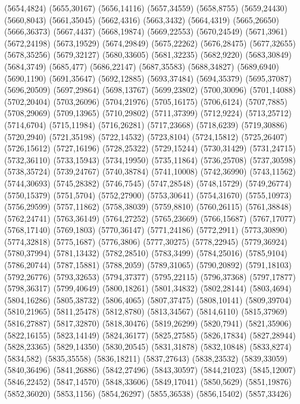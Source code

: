 (5654,4824)
(5655,30167)
(5656,14116)
(5657,34559)
(5658,8755)
(5659,24430)
(5660,8043)
(5661,35045)
(5662,4316)
(5663,3432)
(5664,4319)
(5665,26650)
(5666,36373)
(5667,4437)
(5668,19874)
(5669,22553)
(5670,24549)
(5671,3961)
(5672,24198)
(5673,19529)
(5674,29849)
(5675,22262)
(5676,28475)
(5677,32655)
(5678,35256)
(5679,32127)
(5680,33605)
(5681,32235)
(5682,9220)
(5683,30849)
(5684,3749)
(5685,477)
(5686,22147)
(5687,35583)
(5688,34827)
(5689,6940)
(5690,1190)
(5691,35647)
(5692,12885)
(5693,37484)
(5694,35379)
(5695,37087)
(5696,20509)
(5697,29864)
(5698,13767)
(5699,23802)
(5700,30096)
(5701,14088)
(5702,20404)
(5703,26096)
(5704,21976)
(5705,16175)
(5706,6124)
(5707,7885)
(5708,29069)
(5709,13965)
(5710,29802)
(5711,37399)
(5712,9224)
(5713,25712)
(5714,6704)
(5715,11984)
(5716,26281)
(5717,23668)
(5718,6239)
(5719,30886)
(5720,2940)
(5721,35198)
(5722,14532)
(5723,8104)
(5724,15812)
(5725,26407)
(5726,15612)
(5727,16196)
(5728,25322)
(5729,15244)
(5730,31429)
(5731,24715)
(5732,36110)
(5733,15943)
(5734,19950)
(5735,11864)
(5736,25708)
(5737,30598)
(5738,35724)
(5739,24767)
(5740,38784)
(5741,10008)
(5742,36990)
(5743,11562)
(5744,30693)
(5745,28382)
(5746,7545)
(5747,28548)
(5748,15729)
(5749,26774)
(5750,15379)
(5751,5704)
(5752,27900)
(5753,30641)
(5754,31670)
(5755,10973)
(5756,29599)
(5757,11862)
(5758,38039)
(5759,8810)
(5760,26115)
(5761,38848)
(5762,24741)
(5763,36149)
(5764,27252)
(5765,23669)
(5766,15687)
(5767,17077)
(5768,17140)
(5769,1803)
(5770,36147)
(5771,24186)
(5772,2911)
(5773,30890)
(5774,32818)
(5775,1687)
(5776,3806)
(5777,30275)
(5778,22945)
(5779,36924)
(5780,37994)
(5781,13432)
(5782,28510)
(5783,3499)
(5784,25016)
(5785,9104)
(5786,20744)
(5787,15881)
(5788,2059)
(5789,31065)
(5790,20892)
(5791,18103)
(5792,26776)
(5793,32653)
(5794,37377)
(5795,22115)
(5796,37368)
(5797,17877)
(5798,36317)
(5799,40649)
(5800,18261)
(5801,34832)
(5802,28144)
(5803,4694)
(5804,16286)
(5805,38732)
(5806,4065)
(5807,37475)
(5808,10141)
(5809,39704)
(5810,21965)
(5811,25478)
(5812,8780)
(5813,34567)
(5814,6110)
(5815,37969)
(5816,27887)
(5817,32870)
(5818,30476)
(5819,26299)
(5820,7941)
(5821,35906)
(5822,16155)
(5823,14149)
(5824,36177)
(5825,27585)
(5826,17834)
(5827,28944)
(5828,23365)
(5829,14350)
(5830,20545)
(5831,31878)
(5832,10848)
(5833,8274)
(5834,582)
(5835,35558)
(5836,18211)
(5837,27643)
(5838,23532)
(5839,33059)
(5840,36496)
(5841,26886)
(5842,27496)
(5843,30597)
(5844,21023)
(5845,12007)
(5846,22452)
(5847,14570)
(5848,33606)
(5849,17041)
(5850,5629)
(5851,19876)
(5852,36020)
(5853,1156)
(5854,26297)
(5855,36538)
(5856,15402)
(5857,33426)
